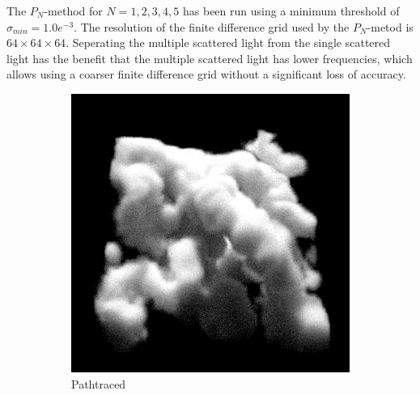 The $P_N$-method for $N={1,2,3,4,5}$ has been run using a minimum threshold of $\sigma_{min}=1.0e^{-3}$. The resolution of the finite difference grid used by the $P_N$-metod is $64\times 64\times 64$. Seperating the multiple scattered light from the single scattered light has the benefit that the multiple scattered light has lower frequencies, which allows using a coarser finite difference grid without a significant loss of accuracy.
\begin{figure}[h]
\centering
\begin{subfigure}{0.49\columnwidth}
\includegraphics[width=\columnwidth]{04_pn_method/results/nebulae_ms_groundtruth.png}
\caption{Pathtraced}
\label{fig:pn_results_nebulae1_pathtraced}
\end{subfigure}%
\hspace{0.01\columnwidth}
\begin{subfigure}{0.49\columnwidth}

\end{subfigure}
\end{figure}
